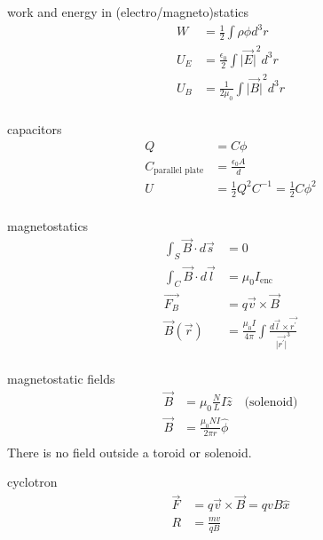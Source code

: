 \documentclass[avery5388, frame, grid]{flashcards}
\begin{document}
\begin{flashcard}{work and energy in (electro/magneto)statics}
  {
    \begin{align*}
      W &= \frac{1}{2} \int \rho \phi d^{3}r\\
      U_{E} &= \frac{\epsilon_{0}}{2} \int {\lvert \vec{E} \lvert}^{2} d^{3}r\\
      U_{B} &= \frac{1}{2 \mu_{0}} \int {\lvert \vec{B} \lvert}^{2} d^{3}r\\
    \end{align*}
  }
\end{flashcard}

\begin{flashcard}{capacitors}
  {
    \begin{align*}
      Q &= C \phi\\
      C_{\textrm{parallel plate}} &= \frac{\epsilon_{0} A}{d}\\
      U &= \frac{1}{2} Q^{2} C^{-1} = \frac{1}{2} C \phi^{2}\\
    \end{align*}
  }
\end{flashcard}

\begin{flashcard}{magnetostatics}
  {
    \begin{align*}
      \int_{S} \vec{B} \cdot d\vec{s} &= 0\\
      \int_{C} \vec{B} \cdot d\vec{l} &= \mu_{0} I_{\textrm{enc}}\\
      \vec{F_{B}} &= q\vec{v} \times \vec{B}\\
      \vec{B}(\vec{r}) &= \frac{\mu_{0} I}{4 \pi} \int \frac{d\vec{l} \times \vec{r^{'}}}{{\lvert \vec{r^{'}}\lvert}^{3}}\\
    \end{align*}
  }
\end{flashcard}

\begin{flashcard}{magnetostatic fields}
  {
    \begin{align*}
      \vec{B} &= \mu_{0} \frac{N}{L} I \hat{z} \quad \textrm{(solenoid)}\\
      \vec{B} &= \frac{\mu_{0} N I}{2 \pi r} \hat{\phi}\\
    \end{align*}
    There is no field outside a toroid or solenoid.
  }
\end{flashcard}

\begin{flashcard}{cyclotron}
  {
    \begin{align*}
      \vec{F} &= q \vec{v} \times \vec{B} = qvB \hat{x}\\
      R &= \frac{mv}{qB}\\
    \end{align*}
  }
\end{flashcard}
\end{document}
